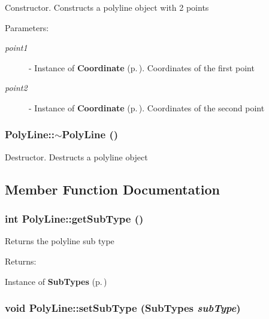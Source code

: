 Constructor. Constructs a polyline object with 2 points \begin{Desc}
\item[Parameters: ]\par
\begin{description}
\item[{\em 
point1}]- Instance of {\bf Coordinate} {\rm (p.\,\pageref{classCoordinate})}. Coordinates of the first point \item[{\em 
point2}]- Instance of {\bf Coordinate} {\rm (p.\,\pageref{classCoordinate})}. Coordinates of the second point \end{description}
\end{Desc}
\subsubsection{\setlength{\rightskip}{0pt plus 5cm}Poly\-Line::$\sim$Poly\-Line ()}\label{classPolyLine_a2}


Destructor. Destructs a polyline object 

\subsection{Member Function Documentation}
\subsubsection{\setlength{\rightskip}{0pt plus 5cm}int Poly\-Line::get\-Sub\-Type ()\hspace{0.3cm}{\tt  [inline]}}\label{classPolyLine_a3}


Returns the polyline sub type \begin{Desc}
\item[Returns: ]\par
Instance of {\bf Sub\-Types} {\rm (p.\,\pageref{classPolyLine_s5})} \end{Desc}
\subsubsection{\setlength{\rightskip}{0pt plus 5cm}void Poly\-Line::set\-Sub\-Type ({\bf Sub\-Types} {\em sub\-Type})\hspace{0.3cm}{\tt  [inline, protected]}}\label{classPolyLine_b0}


